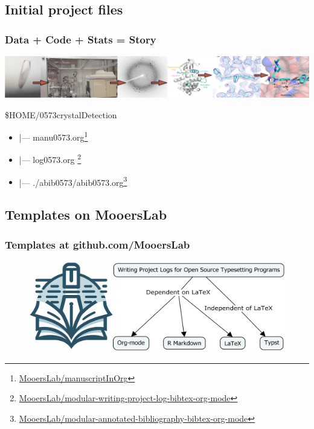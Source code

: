 \documentclass[aspectratio=169]{beamer}
\begin{document}
\subsection{Initial project files}
\begin{frame}
\frametitle{Data + Code + Stats = Story}
\begin{center}
\includegraphics[scale=0.205]{Figures/workflowAB.png}
\end{center}
\vspace{1em}
\Large{
\$HOME/0573crystalDetection
\begin{itemize}
    \item   |--- manu0573.org\footnote{\url{MooersLab/manuscriptInOrg}}
    \item   |--- log0573.org \footnote{\url{MooersLab/modular-writing-project-log-bibtex-org-mode}}
    \item   |--- ./abib0573/abib0573.org\footnote{\url{MooersLab/modular-annotated-bibliography-bibtex-org-mode}}
\end{itemize}
}
\end{frame}


\subsection{Templates on MooersLab}
\begin{frame}
\frametitle{Templates at github.com/MooersLab}
\begin{center}
            \begin{figure}
                \includegraphics[scale=0.26]{Figures/templates.png}
            \end{figure}
\end{center}
\end{frame}
\end{document}
